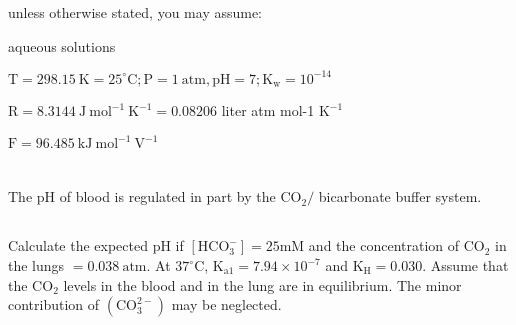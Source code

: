 \documentclass[12pt]{article}
\begin{document}
unless otherwise stated, you may assume:

aqueous solutions

$\mathrm{T}=298.15 \mathrm{~K}=25^{\circ} \mathrm{C} ; \mathrm{P}=1 \mathrm{~atm}, \mathrm{pH}=7 ; \mathrm{K}_{\mathrm{w}}=10^{-14}$

$\mathrm{R}=8.3144 \mathrm{~J} \mathrm{~mol}^{-1} \mathrm{~K}^{-1}=0.08206$ liter atm mol-1 $\mathrm{K}^{-1}$

$\mathrm{F}=96.485 \mathrm{~kJ} \mathrm{~mol}^{-1} \mathrm{~V}^{-1}$







\section{}
The $\mathrm{pH}$ of blood is regulated in part by the $\mathrm{CO}_{2} /$ bicarbonate buffer system.
\subsection{}

Calculate the expected $\mathrm{pH}$ if $\left[\mathrm{HCO}_{3}^{-}\right]=25 \mathrm{mM}$ and the concentration of $\mathrm{CO}_{2}$ in the lungs $=0.038 \mathrm{~atm}$. At $37^{\circ} \mathrm{C}$, $\mathrm{K}_{\mathrm{a} 1}=7.94 \times 10^{-7}$ and $\mathrm{K}_{\mathrm{H}}=0.030$. Assume that the $\mathrm{CO}_{2}$ levels in the blood and in the lung are in equilibrium. The minor contribution of $\left(\mathrm{CO}_{3}^{2-}\right)$ may be neglected.
\end{document}
